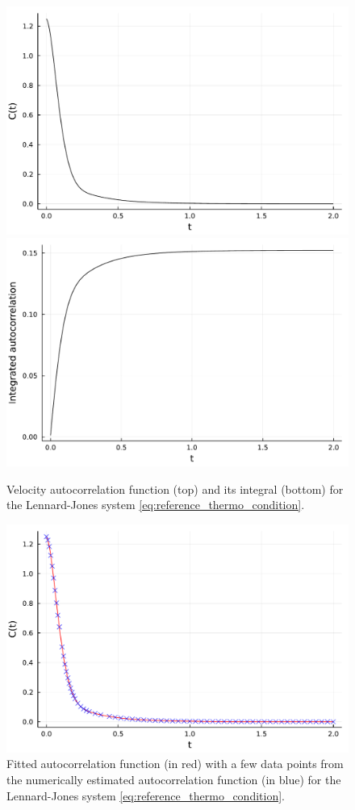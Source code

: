 \begin{figure}[htbp]
    \begin{center}
      \includegraphics[width=0.7\linewidth]{figures/autocorr.pdf}
      \includegraphics[width=0.7\linewidth]{figures/int_autocorr.pdf}
      \caption{ \label{fig:gk_mobility}
        Velocity autocorrelation function (top) and its integral (bottom) for the Lennard-Jones system \eqref{eq:reference_thermo_condition}.
      }
    \end{center}
  \end{figure}

  \begin{figure}[htbp]
    \begin{center}
      \includegraphics[width=0.8\linewidth]{figures/autocorr_fit.pdf}
      \caption{ \label{fig:fit_gk_mobility}
        Fitted autocorrelation function (in red) with a few data points from the numerically estimated autocorrelation function (in blue) for the Lennard-Jones system \eqref{eq:reference_thermo_condition}.
      }
    \end{center}
  \end{figure}

